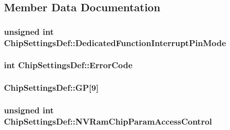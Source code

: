 \subsection{\-Member \-Data \-Documentation}
\hypertarget{struct_chip_settings_def_af61e2aaa5bcf3284abd4554d2be88002}{
\subsubsection[{\-Dedicated\-Function\-Interrupt\-Pin\-Mode}]{\setlength{\rightskip}{0pt plus 5cm}unsigned int {\bf \-Chip\-Settings\-Def\-::\-Dedicated\-Function\-Interrupt\-Pin\-Mode}}}\label{struct_chip_settings_def_af61e2aaa5bcf3284abd4554d2be88002}
\hypertarget{struct_chip_settings_def_a711cd7ddde92dcfefaba6863b303ab3d}{
\subsubsection[{\-Error\-Code}]{\setlength{\rightskip}{0pt plus 5cm}int {\bf \-Chip\-Settings\-Def\-::\-Error\-Code}}}\label{struct_chip_settings_def_a711cd7ddde92dcfefaba6863b303ab3d}
\hypertarget{struct_chip_settings_def_aea8065ee4c940dcbde93dd1633c63f38}{
\subsubsection[{\-G\-P}]{ {\bf \-Chip\-Settings\-Def\-::\-G\-P}\mbox{[}9\mbox{]}}}\label{struct_chip_settings_def_aea8065ee4c940dcbde93dd1633c63f38}
\hypertarget{struct_chip_settings_def_a56bcb330a04c9b6b108ee63ce635c92d}{
\subsubsection[{\-N\-V\-Ram\-Chip\-Param\-Access\-Control}]{\setlength{\rightskip}{0pt plus 5cm}unsigned int {\bf \-Chip\-Settings\-Def\-::\-N\-V\-Ram\-Chip\-Param\-Access\-Control}}}\label{struct_chip_settings_def_a56bcb330a04c9b6b108ee63ce635c92d}
